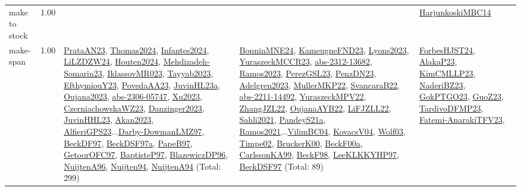 {\begin{longtable}{p{3cm}r>{\raggedright\arraybackslash}p{6cm}>{\raggedright\arraybackslash}p{6cm}>{\raggedright\arraybackslash}p{8cm}}
\index{make to stock}\index{Concepts!make to stock}make to stock &  1.00 &  &  & \hyperref[detail:HarjunkoskiMBC14]{HarjunkoskiMBC14}\\
\index{make-span}\index{Concepts!make-span}make-span &  1.00 & \hyperref[detail:PrataAN23]{PrataAN23}, \hyperref[detail:Thomas2024]{Thomas2024}, \hyperref[detail:Infantes2024]{Infantes2024}, \hyperref[detail:LiLZDZW24]{LiLZDZW24}, \hyperref[detail:Houten2024]{Houten2024}, \hyperref[detail:Mehdizadeh-Somarin23]{Mehdizadeh-Somarin23}, \hyperref[detail:IklassovMR023]{IklassovMR023}, \hyperref[detail:Tayyab2023]{Tayyab2023}, \hyperref[detail:EfthymiouY23]{EfthymiouY23}, \hyperref[detail:PovedaAA23]{PovedaAA23}, \hyperref[detail:JuvinHL23a]{JuvinHL23a}, \hyperref[detail:Oujana2023]{Oujana2023}, \hyperref[detail:abs-2306-05747]{abs-2306-05747}, \hyperref[detail:Xu2023]{Xu2023}, \hyperref[detail:CzerniachowskaWZ23]{CzerniachowskaWZ23}, \hyperref[detail:Danzinger2023]{Danzinger2023}, \hyperref[detail:JuvinHHL23]{JuvinHHL23}, \hyperref[detail:Akan2023]{Akan2023}, \hyperref[detail:AlfieriGPS23]{AlfieriGPS23}...\hyperref[detail:Darby-DowmanLMZ97]{Darby-DowmanLMZ97}, \hyperref[detail:BeckDF97]{BeckDF97}, \hyperref[detail:BeckDSF97a]{BeckDSF97a}, \hyperref[detail:PapeB97]{PapeB97}, \hyperref[detail:GetoorOFC97]{GetoorOFC97}, \hyperref[detail:BaptisteP97]{BaptisteP97}, \hyperref[detail:BlazewiczDP96]{BlazewiczDP96}, \hyperref[detail:NuijtenA96]{NuijtenA96}, \hyperref[detail:Nuijten94]{Nuijten94}, \hyperref[detail:NuijtenA94]{NuijtenA94} (Total: 299) & \hyperref[detail:BonninMNE24]{BonninMNE24}, \hyperref[detail:KameugneFND23]{KameugneFND23}, \hyperref[detail:Lyons2023]{Lyons2023}, \hyperref[detail:YuraszeckMCCR23]{YuraszeckMCCR23}, \hyperref[detail:abs-2312-13682]{abs-2312-13682}, \hyperref[detail:Ramos2023]{Ramos2023}, \hyperref[detail:PerezGSL23]{PerezGSL23}, \hyperref[detail:PenzDN23]{PenzDN23}, \hyperref[detail:Adelgren2023]{Adelgren2023}, \hyperref[detail:MullerMKP22]{MullerMKP22}, \hyperref[detail:SvancaraB22]{SvancaraB22}, \hyperref[detail:abs-2211-14492]{abs-2211-14492}, \hyperref[detail:YuraszeckMPV22]{YuraszeckMPV22}, \hyperref[detail:ZhangJZL22]{ZhangJZL22}, \hyperref[detail:OujanaAYB22]{OujanaAYB22}, \hyperref[detail:LiFJZLL22]{LiFJZLL22}, \hyperref[detail:Sahli2021]{Sahli2021}, \hyperref[detail:PandeyS21a]{PandeyS21a}, \hyperref[detail:Ramos2021]{Ramos2021}...\hyperref[detail:VilimBC04]{VilimBC04}, \hyperref[detail:KovacsV04]{KovacsV04}, \hyperref[detail:Wolf03]{Wolf03}, \hyperref[detail:Timpe02]{Timpe02}, \hyperref[detail:BruckerK00]{BruckerK00}, \hyperref[detail:BeckF00a]{BeckF00a}, \hyperref[detail:CarlssonKA99]{CarlssonKA99}, \hyperref[detail:BeckF98]{BeckF98}, \hyperref[detail:LeeKLKKYHP97]{LeeKLKKYHP97}, \hyperref[detail:BeckDSF97]{BeckDSF97} (Total: 89) & \hyperref[detail:ForbesHJST24]{ForbesHJST24}, \hyperref[detail:AlakaP23]{AlakaP23}, \hyperref[detail:KimCMLLP23]{KimCMLLP23}, \hyperref[detail:NaderiBZ23]{NaderiBZ23}, \hyperref[detail:GokPTGO23]{GokPTGO23}, \hyperref[detail:GuoZ23]{GuoZ23}, \hyperref[detail:TardivoDFMP23]{TardivoDFMP23}, \hyperref[detail:Fatemi-AnarakiTFV23]{Fatemi-AnarakiTFV23}, 
\end{longtable}}
